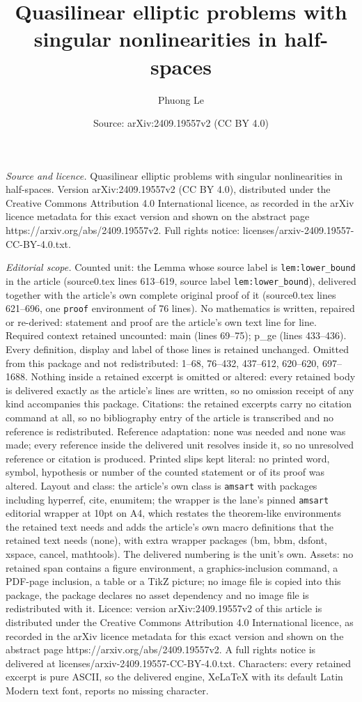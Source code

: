 \documentclass[10pt,a4paper]{amsart}
\title[Quasilinear elliptic problems with singular nonlinearities i]{Quasilinear elliptic problems with singular nonlinearities in half-spaces}
\author{Phuong Le}
\date{Source: arXiv:2409.19557v2 (CC BY 4.0)}
\begin{document}
\maketitle

\noindent\emph{Source and licence.} Quasilinear elliptic problems with singular nonlinearities in half-spaces. Version arXiv:2409.19557v2 (CC BY 4.0), distributed under the Creative Commons Attribution 4.0 International licence, as recorded in the arXiv licence metadata for this exact version and shown on the abstract page https://arxiv.org/abs/2409.19557v2. Full rights notice: licenses/arxiv-2409.19557-CC-BY-4.0.txt.\par\smallskip

\noindent\textit{Editorial scope.} Counted unit: the Lemma whose source label is \texttt{lem:lower\_bound} in the article (source0.tex lines 613--619, source label \texttt{lem:lower\_bound}), delivered together with the article's own complete original proof of it (source0.tex lines 621--696, one \texttt{proof} environment of 76 lines). No mathematics is written, repaired or re-derived: statement and proof are the article's own text line for line. Required context retained uncounted: main (lines 69--75); p\_ge (lines 433--436). Every definition, display and label of those lines is retained unchanged. Omitted from this package and not redistributed: 1--68, 76--432, 437--612, 620--620, 697--1688. Nothing inside a retained excerpt is omitted or altered: every retained body is delivered exactly as the article's lines are written, so no omission receipt of any kind accompanies this package. Citations: the retained excerpts carry no citation command at all, so no bibliography entry of the article is transcribed and no reference is redistributed. Reference adaptation: none was needed and none was made; every reference inside the delivered unit resolves inside it, so no unresolved reference or citation is produced. Printed slips kept literal: no printed word, symbol, hypothesis or number of the counted statement or of its proof was altered. Layout and class: the article's own class is \texttt{amsart} with packages including hyperref, cite, enumitem; the wrapper is the lane's pinned \texttt{amsart} editorial wrapper at 10pt on A4, which restates the theorem-like environments the retained text needs and adds the article's own macro definitions that the retained text needs (none), with extra wrapper packages (bm, bbm, dsfont, xspace, cancel, mathtools). The delivered numbering is the unit's own. Assets: no retained span contains a figure environment, a graphics-inclusion command, a PDF-page inclusion, a table or a TikZ picture; no image file is copied into this package, the package declares no asset dependency and no image file is redistributed with it. Licence: version arXiv:2409.19557v2 of this article is distributed under the Creative Commons Attribution 4.0 International licence, as recorded in the arXiv licence metadata for this exact version and shown on the abstract page https://arxiv.org/abs/2409.19557v2. A full rights notice is delivered at licenses/arxiv-2409.19557-CC-BY-4.0.txt. Characters: every retained excerpt is pure ASCII, so the delivered engine, XeLaTeX with its default Latin Modern text font, reports no missing character.
\end{document}
